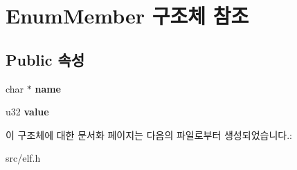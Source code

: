 \hypertarget{struct_enum_member}{}\section{Enum\+Member 구조체 참조}
\label{struct_enum_member}
\subsection*{Public 속성}
\begin{DoxyCompactItemize}
\item 
\mbox{\label{struct_enum_member_aee93a0df0cd2b1a1fe587878fbd10379}} 
char $\ast$ {\bfseries name}
\item 
\mbox{\label{struct_enum_member_a087360a6d98032f07a743435e3c19b43}} 
u32 {\bfseries value}
\end{DoxyCompactItemize}


이 구조체에 대한 문서화 페이지는 다음의 파일로부터 생성되었습니다.\+:\begin{DoxyCompactItemize}
\item 
src/elf.\+h\end{DoxyCompactItemize}

